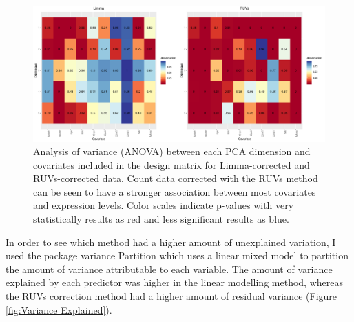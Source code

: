\documentclass[12pt,a4paper,titlepage,twoside,openright]{book}
\begin{document}
\begin{mainmatter}
{\begin{figure}[htb!]
\centering
\includegraphics[width=\textwidth,height=\textheight,keepaspectratio]{Figures/Heatmap_SigCovar_RUVvsLM_OnlyCovarInLM.pdf}
\caption{Analysis of variance (ANOVA) between each PCA dimension and covariates included in the design matrix for Limma-corrected and RUVs-corrected data. Count data corrected with the RUVs method can be seen to have a stronger association between most covariates and expression levels. Color scales indicate p-values with very statistically results as red and less significant results as blue.}
\label{fig:RUV vs Limma: Heatmap of Covariates}
\end{figure}

In order to see which method had a higher amount of unexplained variation, I used the package variance Partition \cite{hoffman2016variancepartition} which uses a linear mixed model to partition the amount of variance attributable to each variable. The amount of variance explained by each predictor was higher in the linear modelling method, whereas the RUVs correction method had a higher amount of residual variance (﻿Figure \ref{fig:Variance Explained}).

}
\end{mainmatter}
\end{document}
